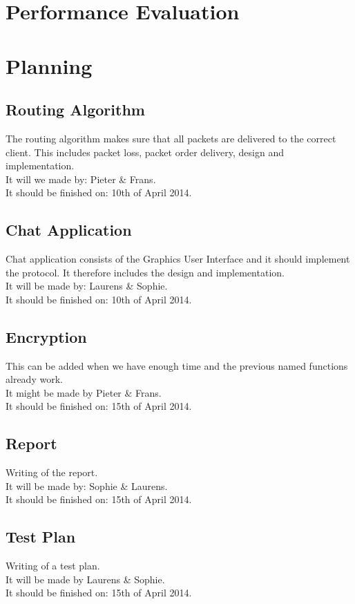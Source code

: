 \documentclass{article}
\begin{document}
\section{Performance Evaluation}

\section{Planning}
    \subsection{Routing Algorithm}
    The routing algorithm makes sure that all packets are delivered to the correct client. This includes packet loss, packet order delivery, design and implementation. \\
    It will we made by: Pieter \& Frans. \\
    It should be finished on: 10th of April 2014.

    \subsection{Chat Application}
    Chat application consists of the Graphics User Interface and it should implement the protocol. It therefore includes the design and implementation. \\
    It will be made by: Laurens \& Sophie. \\
    It should be finished on: 10th of April 2014.

    \subsection{Encryption}
    This can be added when we have enough time and the previous named functions already work. \\
    It might be made by Pieter \& Frans. \\
    It should be finished on: 15th of April 2014.

    \subsection{Report}
    Writing of the report. \\
    It will be made by: Sophie \& Laurens. \\
    It should be finished on: 15th of April 2014.

    \subsection{Test Plan}
    Writing of a test plan. \\
    It will be made by Laurens \& Sophie. \\
    It should be finished on: 15th of April 2014.
\end{document}
